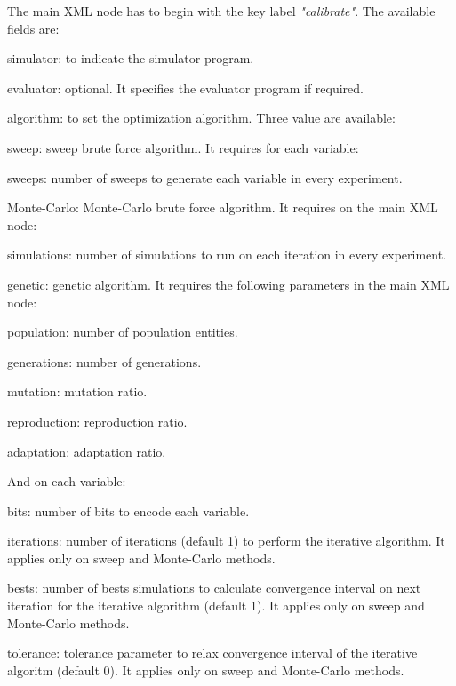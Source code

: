 \documentclass[review,authoryear]{elsarticle}
\begin{document}
The main XML node has to begin with the key label \emph{"calibrate"}. The
available fields are:
\begin{description}
\item{simulator}: to indicate the simulator program.
\item{evaluator}: optional. It specifies the evaluator program if required.
\item{algorithm}: to set the optimization algorithm. Three value are available:
	\begin{description}
	\item{sweep}: sweep brute force algorithm. It requires for each variable:
		\begin{description}
		\item{sweeps}: number of sweeps to generate each variable in every
			experiment.
		\end{description}
	\item{Monte-Carlo}: Monte-Carlo brute force algorithm. It requires on the main
		XML node:
		\begin{description}
		\item{simulations}: number of simulations to run on each iteration in
			every experiment.
		\end{description}
	\item{genetic}: genetic algorithm. It requires the following parameters in the
		main XML node:
		\begin{description}
		\item{population}: number of population entities.
		\item{generations}: number of generations.
		\item{mutation}: mutation ratio.
		\item{reproduction}: reproduction ratio.
		\item{adaptation}: adaptation ratio.
		\end{description}
	And on each variable:
		\begin{description}
		\item{bits}: number of bits to encode each variable.
		\end{description}
	\end{description}
\item{iterations}: number of iterations (default 1) to perform the iterative
algorithm. It applies only on sweep and Monte-Carlo methods.
\item{bests}: number of bests simulations to calculate convergence interval on
next iteration for the iterative algorithm (default 1). It applies only on
sweep and Monte-Carlo methods.
\item{tolerance}: tolerance parameter to relax convergence interval of the
iterative algoritm (default 0). It applies only on sweep and Monte-Carlo
methods.
\end{description}
\end{document}
